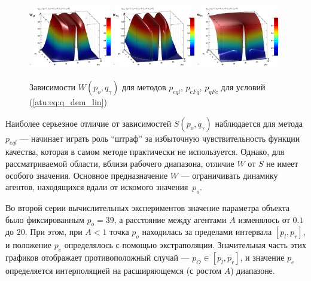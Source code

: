 \begin{figure}[htb!]
  \centerline{
    \includegraphics[width=0.32\textwidth]{p/qls_pe-p_po_qg_Wql_lin.png}
    \hfill
    \includegraphics[width=0.32\textwidth]{p/qls_pe-p_po_qg_WFq_lin.png}
    \hfill
    \includegraphics[width=0.32\textwidth]{p/qls_pe-p_po_qg_WFc_lin.png}
  }
  \caption{Зависимости $W(p_o,q_\gamma)$ для методов $p_{eql}$, $p_{eFq}$, $p_{qFc}$ для условий (\ref{atu:eq:q_dem_lin})}
  \label{atu:f:qsl_W_po_qg_lin}
\end{figure}

Наиболее серьезное отличие от зависимостей $S(p_o,q_\gamma)$ наблюдается
для метода $p_{eql}$ --- начинает играть роль ``штраф'' за
избыточную чувствительность функции качества, которая в самом методе
практически не используется. Однако, для рассматриваемой области,
вблизи рабочего диапазона, отличие $W$ от $S$ не имеет особого значения.
Основное предназначение $W$ --- ограничивать динамику агентов,
находящихся вдали от искомого значения~$p_o$.


Во второй серии вычислительных экспериментов
значение параметра объекта
было фиксированным $p_o=39$,
а расстояние между агентами $A$
изменялось от $0.1$ до $20$.
При этом, при $A<1$
точка $p_o$ находилась за пределами интервала $[p_l,p_r]$,
и положение $p_e$ определялось с помощью экстраполяции.
Значительная часть этих графиков отображает противоположный случай ---
$p_O \in [p_l, p_r]$, и значение $p_e$ определяется
интерполяцией на расширяющемся (с ростом $A$) диапазоне.

